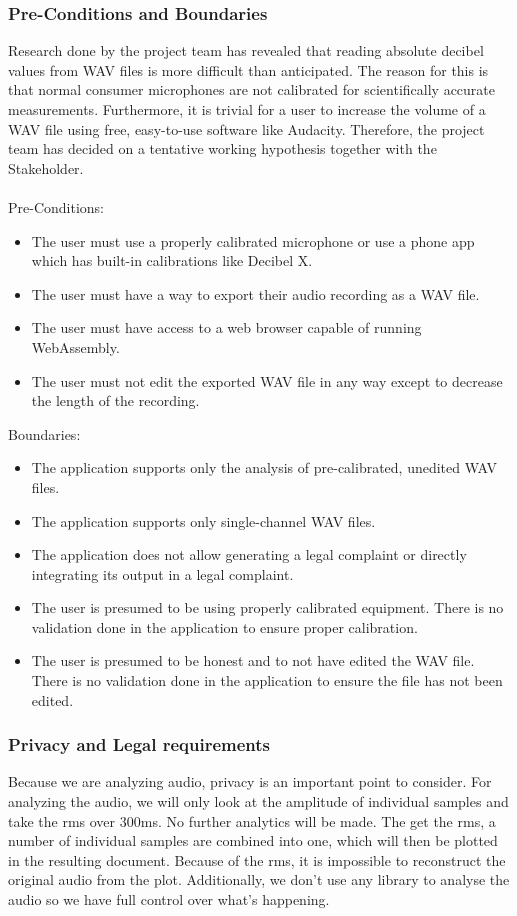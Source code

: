 \subsubsection{Pre-Conditions and Boundaries}\label{subsubsec:pre_conditions_and_boundaries}
Research done by the project team has revealed that reading absolute decibel values from WAV files is more difficult than anticipated.
The reason for this is that normal consumer microphones are not calibrated for scientifically accurate measurements\cite{stackoverflow_spl}. Furthermore, it is trivial for a user
to increase the volume of a WAV file using free, easy-to-use software like Audacity\cite{audacity,audacity_amplify}.
Therefore, the project team has decided on a tentative working hypothesis together with the Stakeholder. \\~\\
Pre-Conditions:
\begin{itemize}
    \item The user must use a properly calibrated microphone or use a phone app which has built-in calibrations like Decibel X\cite{decibelx_ios}\cite{decibelx_android}.
    \item The user must have a way to export their audio recording as a WAV file.
    \item The user must have access to a web browser capable of running WebAssembly.
    \item The user must not edit the exported WAV file in any way except to decrease the length of the recording.
\end{itemize}
Boundaries:
\begin{itemize}
    \item The application supports only the analysis of pre-calibrated, unedited WAV files.
    \item The application supports only single-channel WAV files.
    \item The application does not allow generating a legal complaint or directly integrating its output in a legal complaint.
    \item The user is presumed to be using properly calibrated equipment.
          There is no validation done in the application to ensure proper calibration.
    \item The user is presumed to be honest and to not have edited the WAV file.
          There is no validation done in the application to ensure the file has not been edited.
\end{itemize}

\subsubsection{Privacy and Legal requirements}
Because we are analyzing audio, privacy is an important point to consider.
For analyzing the audio, we will only look at the amplitude of individual samples and take the rms over 300ms.
No further analytics will be made.
The get the rms, a number of individual samples are combined into one, which will then be plotted in the resulting document.
Because of the rms, it is impossible to reconstruct the original audio from the plot.
Additionally, we don't use any library to analyse the audio so we have full control over what's happening.

